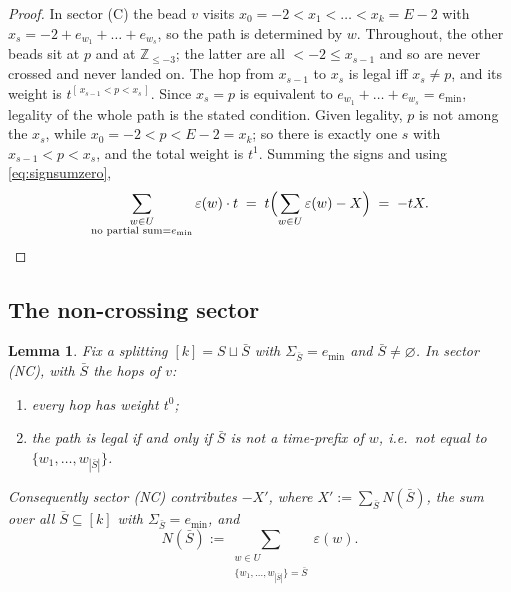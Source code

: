 \documentclass[11pt]{article}
\newtheorem{lemma}[theorem]{Lemma}
\theoremstyle{definition}
\newcommand{\Z}{\mathbb{Z}}
\begin{document}
\begin{proof}
In sector (C) the bead $v$ visits $x_0=-2<x_1<\dots<x_k=E-2$ with
$x_s=-2+e_{w_1}+\dots+e_{w_s}$, so the path is determined by $w$.  Throughout, the other
beads sit at $p$ and at $\Z_{\le-3}$; the latter are all $<-2\le x_{s-1}$ and so are
never crossed and never landed on.  The hop from $x_{s-1}$ to $x_s$ is legal iff
$x_s\ne p$, and its weight is $t^{[\,x_{s-1}<p<x_s\,]}$.  Since $x_s=p$ is equivalent to
$e_{w_1}+\dots+e_{w_s}=e_{\min}$, legality of the whole path is the stated condition.
Given legality, $p$ is not among the $x_s$, while $x_0=-2<p<E-2=x_k$; so there is
exactly one $s$ with $x_{s-1}<p<x_s$, and the total weight is $t^1$.  Summing the signs
and using \eqref{eq:signsumzero},
\[
  \sum_{\substack{w\in U\\ \text{no partial sum}=e_{\min}}}\varepsilon(w)\cdot t
  \;=\;t\Bigl(\sum_{w\in U}\varepsilon(w)-X\Bigr)\;=\;-tX. \qedhere
\]
\end{proof}

\subsection{The non-crossing sector}

\begin{lemma}\label{lem:NC}
Fix a splitting $[k]=S\sqcup\bar S$ with $\Sigma_{\bar S}=e_{\min}$ and
$\bar S\ne\varnothing$.  In sector (NC), with $\bar S$ the hops of $v$:
\begin{enumerate}
\item[(a)] every hop has weight $t^0$;
\item[(b)] the path is legal if and only if $\bar S$ is \emph{not} a time-prefix of $w$,
  i.e.\ not equal to $\{w_1,\dots,w_{|\bar S|}\}$.
\end{enumerate}
Consequently sector (NC) contributes $-X'$, where
$X':=\sum_{\bar S}N(\bar S)$, the sum over all $\bar S\subseteq[k]$ with
$\Sigma_{\bar S}=e_{\min}$, and
\begin{equation}\label{eq:Ndef}
  N(\bar S):=\sum_{\substack{w\in U\\ \{w_1,\dots,w_{|\bar S|}\}=\bar S}}\varepsilon(w).
\end{equation}
\end{lemma}
\end{document}
